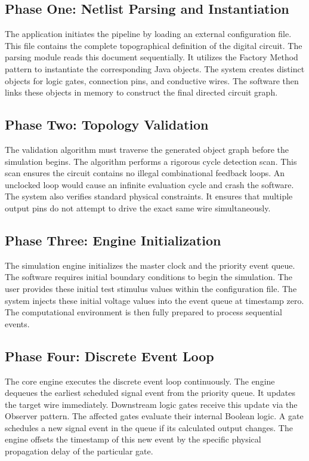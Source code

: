 \documentclass[12pt, a4paper]{article}
\begin{document}
\subsection{Phase One: Netlist Parsing and Instantiation}
The application initiates the pipeline by loading an external configuration file. This file contains the complete topographical definition of the digital circuit. The parsing module reads this document sequentially. It utilizes the Factory Method pattern to instantiate the corresponding Java objects. The system creates distinct objects for logic gates, connection pins, and conductive wires. The software then links these objects in memory to construct the final directed circuit graph.

\subsection{Phase Two: Topology Validation}
The validation algorithm must traverse the generated object graph before the simulation begins. The algorithm performs a rigorous cycle detection scan. This scan ensures the circuit contains no illegal combinational feedback loops. An unclocked loop would cause an infinite evaluation cycle and crash the software. The system also verifies standard physical constraints. It ensures that multiple output pins do not attempt to drive the exact same wire simultaneously.

\subsection{Phase Three: Engine Initialization}
The simulation engine initializes the master clock and the priority event queue. The software requires initial boundary conditions to begin the simulation. The user provides these initial test stimulus values within the configuration file. The system injects these initial voltage values into the event queue at timestamp zero. The computational environment is then fully prepared to process sequential events.

\subsection{Phase Four: Discrete Event Loop}
The core engine executes the discrete event loop continuously. The engine dequeues the earliest scheduled signal event from the priority queue. It updates the target wire immediately. Downstream logic gates receive this update via the Observer pattern. The affected gates evaluate their internal Boolean logic. A gate schedules a new signal event in the queue if its calculated output changes. The engine offsets the timestamp of this new event by the specific physical propagation delay of the particular gate.
\end{document}
